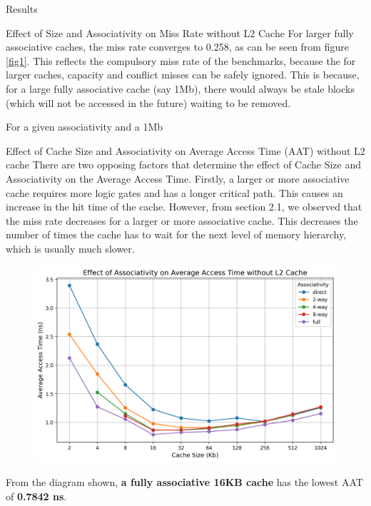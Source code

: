 \begin{section}{Results}
\begin{subsection}{Effect of Size and Associativity on Miss Rate without L2 Cache}
    For larger fully associative caches, the miss rate converges to 0.258, as can be seen from figure \ref{fig1}. This reflects the compulsory miss rate  of the benchmarks, because the for larger caches, capacity and conflict misses can be safely ignored. This is because, for a large fully associative cache (say 1Mb), there would always be stale blocks (which will not be accessed in the future) waiting to be removed. 

    For a given associativity and a 1Mb 


    \end{subsection}

   

    \begin{subsection}{Effect of Cache Size and Associativity on Average Access Time (AAT) without L2 cache }
        There are two opposing factors that determine the effect of Cache Size and Associativity on the Average Access Time. Firstly, a larger or more associative cache requires more logic gates and has a longer critical path. This causes an increase in the hit time of the cache. However, from section 2.1, we observed that the miss rate decreases for a larger or more associative cache. This decreases the number of times the cache has to wait for the next level of memory hierarchy, which is usually much slower.

        \begin{figure}[h]
            \includegraphics[width=\textwidth]{figures/fig2/fig2.png}
            \centering
            \label{fig:fig2}
        \end{figure}

        From the diagram shown, \textbf{a fully associative 16KB cache} has the lowest AAT of \textbf{0.7842 ns}.
    \end{subsection}


\end{section}
